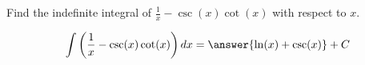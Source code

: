 \documentclass{ximera}
\author{Gregory Hartman \and Matthew Carr\and Nela Lakos}
\begin{document}
\begin{exercise}


Find the indefinite integral of $\frac{1}{x}-\csc(x)\cot(x)$ with respect to $x$.
\begin{prompt}
  \[
  \int \left(\frac{1}{x}-\csc(x)\cot(x)\right) dx=\answer{\ln(x)+\csc(x)}+C
  \]
  \end{prompt}
\end{exercise}
\end{document}
